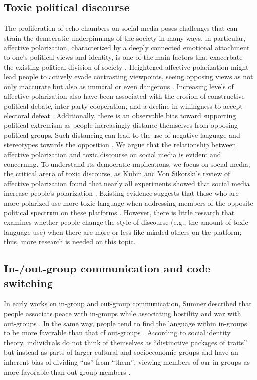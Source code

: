 \documentclass[Crown,sagev,times]{sagej}
\begin{document}
\subsection{Toxic political discourse} \label{sec:affective_polarization}
The proliferation of echo chambers on social media poses challenges that can strain the democratic underpinnings of the society in many ways. In particular, affective polarization, characterized by a deeply connected emotional attachment to one's political views and identity, is one of the main factors that exacerbate the existing political division of society \cite{iyengar2012affect}. Heightened affective polarization might lead people to actively evade contrasting viewpoints, seeing opposing views as not only inaccurate but also as immoral or even dangerous \cite{mutz2018status, prior2005news}. 
Increasing levels of affective polarization also have been associated with the erosion of constructive political debate, inter-party cooperation, and a decline in willingness to accept electoral defeat \cite{iyengar2019origins}. Additionally, there is an observable bias toward supporting political extremism as people increasingly distance themselves from opposing political groups. Such distancing can lead to the use of negative language and stereotypes towards the opposition \cite{kalmoe2019lethal}.
We argue that the relationship between affective polarization and toxic discourse on social media is evident and concerning. To understand its democratic implications, we focus on social media, the critical arena of toxic discourse, as Kubin and Von Sikorski’s review of affective polarization found that nearly all experiments showed that social media increase people’s polarization \cite{kubin2021role}.
Existing evidence suggests that those who are more polarized use more toxic language when addressing members of the opposite political spectrum on these platforms \cite{barbera2015understanding}. However, there is little research that examines whether people change the style of discourse (e.g., the amount of toxic language use) when there are more or less like-minded others on the platform; thus, more research is needed on this topic. 

\subsection{In-/out-group communication and code switching} \label{sec:in_out_group}

In early works on in-group and out-group communication, Sumner described that people associate peace with in-groups while associating hostility and war with out-groups \cite{sumner1906folkways} . 
In the same way, people tend to find the language within in-groups to be more favorable than that of out-groups \cite{tong1999language}. 
According to social identity theory, individuals do not think of themselves as ``distinctive packages of traits'' but instead as parts of larger cultural and socioeconomic groups and have an inherent bias of dividing ``us'' from ``them'', viewing members of our in-groups as more favorable than out-group members \cite{tajfel1979integrative}. 
\end{document}
